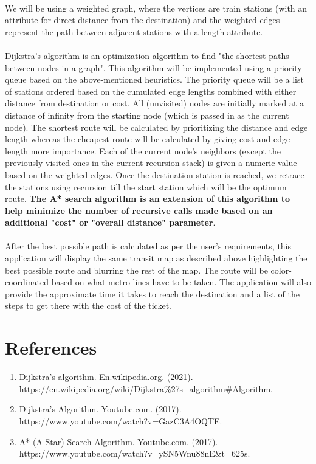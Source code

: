\documentclass[fontsize=11pt]{article}
\begin{document}
 \\
We will be using a weighted graph, where the vertices are train stations (with an attribute for direct distance from the destination) and the weighted edges represent the path between adjacent stations with a length attribute. \\
\\
Dijkstra's algorithm is an optimization algorithm to find "the shortest paths between nodes in a graph". This algorithm will be implemented using a priority queue based on the above-mentioned heuristics. The priority queue will be a list of stations ordered based on the cumulated edge lengths combined with either distance from destination or cost. All (unvisited) nodes are initially marked at a distance of infinity from the starting node (which is passed in as the current node). The shortest route will be calculated by prioritizing the distance and edge length whereas the cheapest route will be calculated by giving cost and edge length more importance. Each of the current node's neighbors (except the previously visited ones in the current recursion stack) is given a numeric value based on the weighted edges. Once the destination station is reached, we retrace the stations using recursion till the start station which will be the optimum route. \textbf{The A* search algorithm is an extension of this algorithm to help minimize the number of recursive calls made based on an additional "cost" or "overall distance" parameter}.\\
\\
After the best possible path is calculated as per the user's requirements, this application will display the same transit map as described above highlighting the best possible route and blurring the rest of the map. The route will be color-coordinated based on what metro lines have to be taken. The application will also provide the approximate time it takes to reach the destination and a list of the steps to get there with the cost of the ticket.
\section*{References}
\begin{enumerate}
    \item Dijkstra's algorithm. En.wikipedia.org. (2021). https://en.wikipedia.org/wiki/Dijkstra\%27s\_algorithm\#Algorithm.
    \item Dijkstra's Algorithm. Youtube.com. (2017). https://www.youtube.com/watch?v=GazC3A4OQTE.
    \item A* (A Star) Search Algorithm. Youtube.com. (2017). https://www.youtube.com/watch?v=ySN5Wnu88nE\&t=625s.
\end{enumerate}


\end{document}
